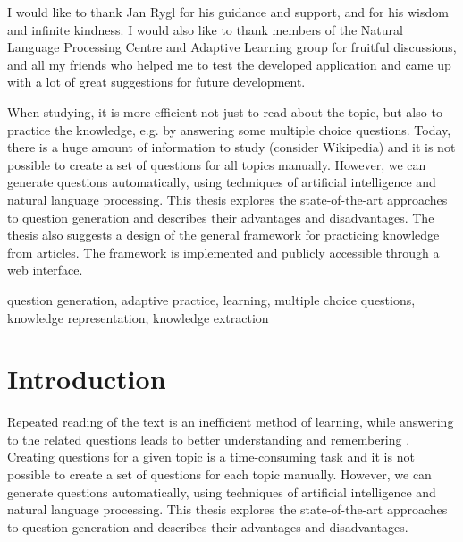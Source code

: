 \documentclass[12pt, twoside]{fithesis2}
\renewcommand{\_}{\leavevmode \kern0.07em\vbox{\hrule width0.4em}}
\newcounter{choice}
\begin{document}
\FrontMatter
\ThesisTitlePage

\begin{ThesisDeclaration}
\DeclarationText
\AdvisorName
\end{ThesisDeclaration}

\begin{ThesisThanks}
  I would like to thank Jan Rygl
  for his guidance and support, and for his wisdom and infinite kindness.
  I would also like to thank members of the Natural Language Processing Centre
  and Adaptive Learning group for fruitful discussions,
  and all my friends who helped me to test the developed application
  and came up with a lot of great suggestions for future development.
\end{ThesisThanks}

\begin{ThesisAbstract}
When studying, it is more efficient not just to read about the topic, but also to practice the knowledge, e.g. by answering some multiple choice questions.
Today, there is a huge amount of information to study (consider Wikipedia) and it is not possible to create a set of questions for all topics manually.
However, we can generate questions automatically, using techniques of artificial intelligence and natural language processing.
This thesis explores the state-of-the-art approaches to question generation and describes their advantages and disadvantages.
The thesis also suggests a design of the general framework for practicing knowledge from articles.
The framework is implemented and publicly accessible through a web interface.
\end{ThesisAbstract}

\begin{ThesisKeyWords}
question generation, adaptive practice,
learning,
multiple choice questions,
knowledge representation, knowledge extraction
\end{ThesisKeyWords}

\MainMatter
\tableofcontents

\chapter{Introduction}
\label{chap:intro}

Repeated reading of the text is an inefficient method of learning,
while answering to the related questions leads to better understanding and remembering \cite{edu-improve}.
Creating questions for a given topic is a time-consuming task
and it is not possible to create a set of questions for each topic manually.
However, we can generate questions automatically, using techniques of artificial intelligence and natural language processing.
This thesis explores the state-of-the-art approaches to question generation and describes their advantages and disadvantages.
\end{document}
